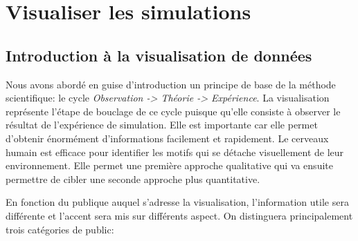 \part{Visualiser les  simulations}

\chapter{Introduction à la visualisation de données}
\label{sec:visu}

Nous avons abordé en guise d'introduction un principe de base de la méthode scientifique: le cycle \textit{Observation -> Théorie -> Expérience}.
La visualisation représente l'étape de bouclage de ce cycle  puisque qu'elle consiste à observer le résultat de l'expérience de simulation.
Elle est importante car elle permet d'obtenir énormément d'informations facilement et rapidement.
Le cerveaux humain est efficace pour identifier les motifs qui se détache visuellement de leur environnement.
Elle permet une première approche qualitative qui va ensuite permettre de cibler une seconde approche plus quantitative.



En fonction du publique auquel s'adresse la visualisation, l'information utile sera différente et l'accent sera mis sur différents aspect.
On distinguera principalement trois catégories de public:

